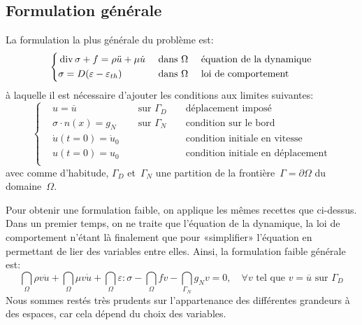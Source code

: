 \subsection{Formulation générale}
La formulation la plus générale du problème est:
\begin{equation}
\left\{
\begin{aligned}
&\operatorname{div}\sigma + f = \rho \ddot{u} + \mu \dot{u} && \text{ dans } \Omega && \text{ équation de la dynamique}\\
&\sigma=D(\varepsilon-\varepsilon_{th}) && \text{ dans } \Omega && \text{ loi de comportement}\\
\end{aligned}\right.
\end{equation}
à laquelle il est nécessaire d'ajouter les conditions aux limites suivantes:
\begin{equation}
\left\{
\begin{aligned}
&u=\overline{u} && \text{ sur } \Gamma_D && \text{ déplacement imposé}\\
&\sigma\cdot n(x)=g_N && \text{ sur } \Gamma_N && \text{ condition sur le bord}\\
&\dot{u}(t=0) = \dot{u}_0&& && \text{ condition initiale en vitesse}\\
&u(t=0) = u_0 && && \text{ condition initiale en déplacement}\\
\end{aligned}
\right.
\end{equation}
avec comme d'habitude, $\Gamma_D$ et~$\Gamma_N$ une partition de la frontière~$\Gamma=\partial\Omega$ du domaine~$\Omega$.

\medskip
Pour obtenir une formulation faible, on applique les mêmes recettes que ci-dessus. Dans un premier temps, on ne traite que l'équation de la dynamique, la loi de comportement n'étant là finalement que pour «simplifier» l'équation en permettant de lier des variables entre elles. Ainsi, la formulation faible générale est:
\begin{equation}
\dint_\Omega \rho v\ddot{u} + \dint_\Omega \mu v\dot{u}
+\dint_\Omega \varepsilon:\sigma - \dint_\Omega fv
-\dint_{\Gamma_N} g_N v =0, \quad \forall v \text{ tel que } v=\overline{u} \text{ sur } \Gamma_D
\end{equation}
Nous sommes restés très prudents sur l'appartenance des différentes grandeurs à des espaces, car cela dépend du choix des variables.

